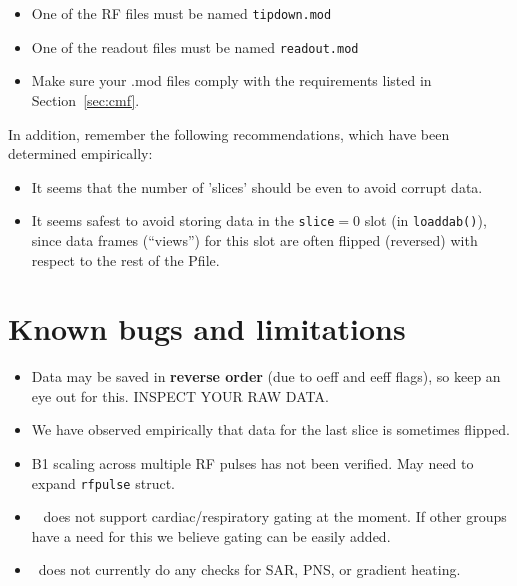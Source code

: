 \begin{itemize}
	\item One of the RF files must be named {\tt tipdown.mod} 
	\item One of the readout files must be named {\tt readout.mod}
	\item Make sure your .mod files comply with the requirements listed in Section~\ref{sec:cmf}.
\end{itemize}

In addition, remember the following recommendations, which have been determined empirically:
\begin{itemize}
	\item It seems that the number of 'slices' should be even to avoid corrupt data.
	\item It seems safest to avoid storing data in the {\tt slice}$=$0 slot (in \texttt{loaddab()}), since data frames (``views'') for this slot are often flipped (reversed) with respect to the rest of the Pfile.
\end{itemize}


\section{Known bugs and limitations}
\begin{itemize}
	\item Data may be saved in \textbf{reverse order} (due to oeff and eeff flags), so keep an eye out for this. INSPECT YOUR RAW DATA.
	\item We have observed empirically that data for the last slice is sometimes flipped.
	\item B1 scaling across multiple RF pulses has not been verified. May need to expand \texttt{rfpulse} struct.
	\item \toppe~ does not support cardiac/respiratory gating at the moment. If other groups have a need for this we believe gating can be easily added.
	\item \toppe~does not currently do any checks for SAR, PNS, or gradient heating.
\end{itemize}

